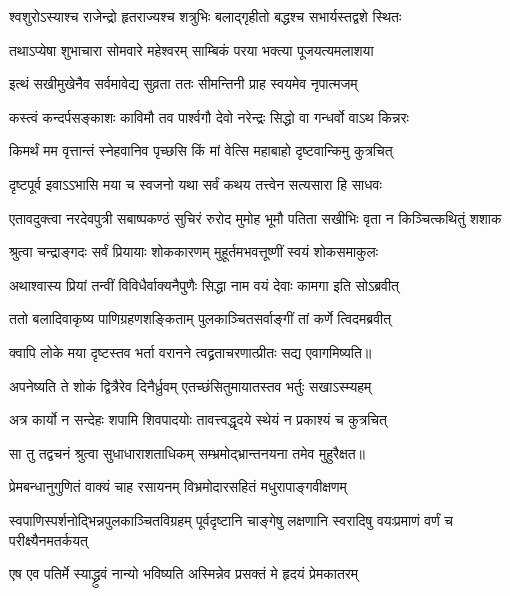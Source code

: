 \twolineshloka
{श्वशुरोऽस्याश्च राजेन्द्रो हृतराज्यश्च शत्रुभिः}
{बलाद्गृहीतो बद्धश्च सभार्यस्तद्वशे स्थितः} %

\twolineshloka
{तथाऽप्येषा शुभाचारा सोमवारे महेश्वरम्}
{साम्बिकं परया भक्त्या पूजयत्यमलाशया} %

\twolineshloka
{इत्थं सखीमुखेनैव सर्वमावेद्य सुव्रता}
{ततः सीमन्तिनी प्राह स्वयमेव नृपात्मजम्} %

\twolineshloka
{कस्त्वं कन्दर्पसङ्काशः काविमौ तव पार्श्वगौ}
{देवो नरेन्द्रः सिद्धो वा गन्धर्वो वाऽथ किन्नरः} %

\twolineshloka
{किमर्थं मम वृत्तान्तं स्नेहवानिव पृच्छसि}
{किं मां वेत्सि महाबाहो दृष्टवान्किमु कुत्रचित्} %

\twolineshloka
{दृष्टपूर्व इवाऽऽभासि मया च स्वजनो यथा}
{सर्वं कथय तत्त्वेन सत्यसारा हि साधवः} %

\fourlineindentedshloka
{एतावदुक्त्वा नरदेवपुत्री}
{सबाष्पकण्ठं सुचिरं रुरोद}
{मुमोह भूमौ पतिता सखीभिः}
{वृता न किञ्चित्कथितुं शशाक} %

\twolineshloka
{श्रुत्वा चन्द्राङ्गदः सर्वं प्रियायाः शोककारणम्}
{मुहूर्तमभवत्तूष्णीं स्वयं शोकसमाकुलः} %

\twolineshloka
{अथाश्वास्य प्रियां तन्वीं विविधैर्वाक्यनैपुणैः}
{सिद्धा नाम वयं देवाः कामगा इति सोऽब्रवीत्} %

\twolineshloka
{ततो बलादिवाकृष्य पाणिग्रहणशङ्किताम्}
{पुलकाञ्चितसर्वाङ्गीं तां कर्णे त्विदमब्रवीत्} %

\twolineshloka
{क्वापि लोके मया दृष्टस्तव भर्ता वरानने}
{त्वद्व्रताचरणात्प्रीतः सद्य एवागमिष्यति॥} %

\twolineshloka
{अपनेष्यति ते शोकं द्वित्रैरेव दिनैर्ध्रुवम्}
{एतच्छंसितुमायातस्तव भर्तुः सखाऽस्म्यहम्} %

\twolineshloka
{अत्र कार्यो न सन्देहः शपामि शिवपादयोः}
{तावत्त्वद्धृदये स्थेयं न प्रकाश्यं च कुत्रचित्} %

\twolineshloka
{सा तु तद्वचनं श्रुत्वा सुधाधाराशताधिकम्}
{सम्भ्रमोद्भ्रान्तनयना तमेव मुहुरैक्षत॥} %

\twolineshloka
{प्रेमबन्धानुगुणितं वाक्यं चाह रसायनम्}
{विभ्रमोदारसहितं मधुरापाङ्गवीक्षणम्} %

\threelineshloka
{स्वपाणिस्पर्शनोद्भिन्नपुलकाञ्चितविग्रहम्}
{पूर्वदृष्टानि चाङ्गेषु लक्षणानि स्वरादिषु}
{वयःप्रमाणं वर्णं च परीक्ष्यैनमतर्कयत्} %

\twolineshloka
{एष एव पतिर्मे स्याद्ध्रुवं नान्यो भविष्यति}
{अस्मिन्नेव प्रसक्तं मे हृदयं प्रेमकातरम्} %

